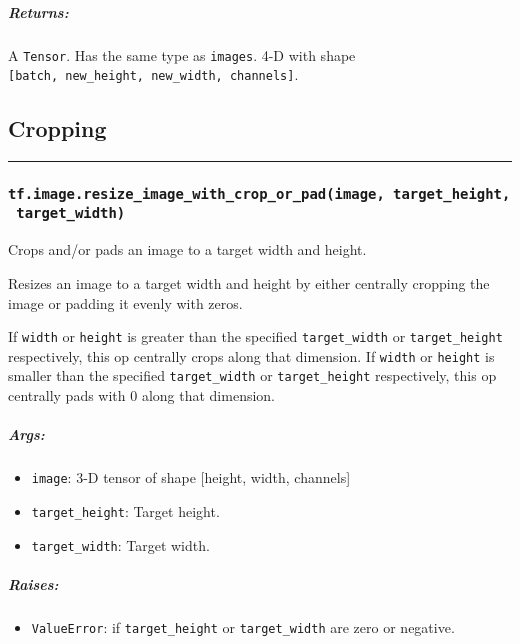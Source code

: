 \subparagraph{Returns: }\label{returns-8}

A \texttt{Tensor}. Has the same type as \texttt{images}. 4-D with shape
\texttt{{[}batch,\ new\_height,\ new\_width,\ channels{]}}.

\subsection{Cropping }\label{cropping}

\begin{center}\rule{0.5\linewidth}{\linethickness}\end{center}

\subsubsection{\texorpdfstring{\texttt{tf.image.resize\_image\_with\_crop\_or\_pad(image,\ target\_height,\ target\_width)}
}{tf.image.resize\_image\_with\_crop\_or\_pad(image, target\_height, target\_width) }}\label{tf.image.resizeux5fimageux5fwithux5fcropux5forux5fpadimage-targetux5fheight-targetux5fwidth}

Crops and/or pads an image to a target width and height.

Resizes an image to a target width and height by either centrally
cropping the image or padding it evenly with zeros.

If \texttt{width} or \texttt{height} is greater than the specified
\texttt{target\_width} or \texttt{target\_height} respectively, this op
centrally crops along that dimension. If \texttt{width} or
\texttt{height} is smaller than the specified \texttt{target\_width} or
\texttt{target\_height} respectively, this op centrally pads with 0
along that dimension.

\subparagraph{Args: }\label{args-9}

\begin{itemize}
\tightlist
\item
  \texttt{image}: 3-D tensor of shape {[}height, width, channels{]}
\item
  \texttt{target\_height}: Target height.
\item
  \texttt{target\_width}: Target width.
\end{itemize}

\subparagraph{Raises: }\label{raises-1}

\begin{itemize}
\tightlist
\item
  \texttt{ValueError}: if \texttt{target\_height} or
  \texttt{target\_width} are zero or negative.
\end{itemize}

